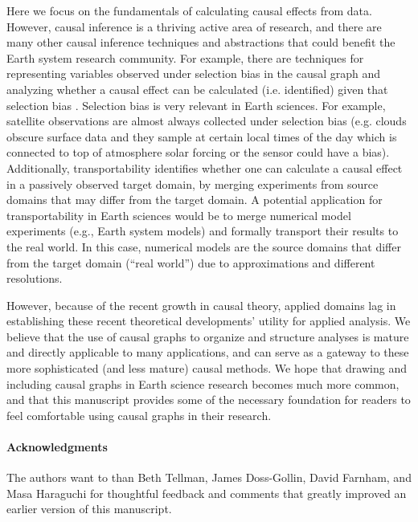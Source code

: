 \documentclass[12pt]{article}
\begin{document}
Here we focus on the fundamentals of calculating causal effects from
data. However, causal inference is a thriving active area of research,
and there are many other causal inference techniques and abstractions
that could benefit the Earth system research community. For example,
there are techniques for representing variables observed under
selection bias in the causal graph and analyzing whether a causal
effect can be calculated (i.e. identified) given that selection bias
\citep[e.g.,][]{bareinboim2014recovering,correa2018generalized}. Selection
bias is very relevant in Earth sciences. For example, satellite
observations are almost always collected under selection bias
(e.g. clouds obscure surface data and they sample at certain local
times of the day which is connected to top of atmosphere solar
forcing or the sensor could have a bias). Additionally, transportability
\citep[e.g.,][]{bareinboim2012transportability,Bareinboim7345,lee2019general}
identifies whether one can calculate a causal effect in a passively
observed target domain, by merging experiments from source domains
that may differ from the target domain. A potential application for
transportability in Earth sciences would be to merge numerical model
experiments (e.g., Earth system models) and formally transport their
results to the real world. In this case, numerical models are the
source domains that differ from the target domain (``real world'') due
to approximations and different resolutions.

However, because of the recent growth in
causal theory, applied domains lag in establishing these recent
theoretical developments' utility for applied analysis. We believe
that the use of causal graphs to organize and structure analyses is
mature and directly applicable to many applications, and can serve as
a gateway to these more sophisticated (and less mature) causal
methods. We hope that drawing and including causal graphs in Earth
science research becomes much more common, and that this manuscript
provides some of the necessary foundation for readers to feel
comfortable using causal graphs in their research.

\paragraph{Acknowledgments} The authors want to than Beth Tellman,
James Doss-Gollin, David Farnham, and Masa Haraguchi for thoughtful
feedback and comments that greatly improved an earlier version of this
manuscript.
\end{document}
